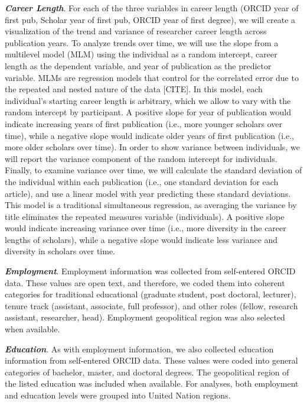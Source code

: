 \documentclass[
  english,
  man]{apa6}
\begin{document}
\textbf{\emph{Career Length}}. For each of the three variables in career length (ORCID year of first pub, Scholar year of first pub, ORCID year of first degree), we will create a visualization of the trend and variance of researcher career length across publication years. To analyze trends over time, we will use the slope from a multilevel model (MLM) using the individual as a random intercept, career length as the dependent variable, and year of publication as the predictor variable. MLMs are regression models that control for the correlated error due to the repeated and nested nature of the data {[}CITE{]}. In this model, each individual's starting career length is arbitrary, which we allow to vary with the random intercept by participant. A positive slope for year of publication would indicate increasing years of first publication (i.e., more younger scholars over time), while a negative slope would indicate older years of first publication (i.e., more older scholars over time). In order to show variance between individuals, we will report the variance component of the random intercept for individuals. Finally, to examine variance over time, we will calculate the standard deviation of the individual within each publication (i.e., one standard deviation for each article), and use a linear model with year predicting these standard deviations. This model is a traditional simultaneous regression, as averaging the variance by title eliminates the repeated measures variable (individuals). A positive slope would indicate increasing variance over time (i.e., more diversity in the career lengths of scholars), while a negative slope would indicate less variance and diversity in scholars over time.

\textbf{\emph{Employment}}. Employment information was collected from self-entered ORCID data. These values are open text, and therefore, we coded them into coherent categories for traditional educational (graduate student, post doctoral, lecturer), tenure track (assistant, associate, full professor), and other roles (fellow, research assistant, researcher, head). Employment geopolitical region was also selected when available.

\textbf{\emph{Education}}. As with employment information, we also collected education information from self-entered ORCID data. These values were coded into general categories of bachelor, master, and doctoral degrees. The geopolitical region of the listed education was included when available. For analyses, both employment and education levels were grouped into United Nation regions.
\end{document}
